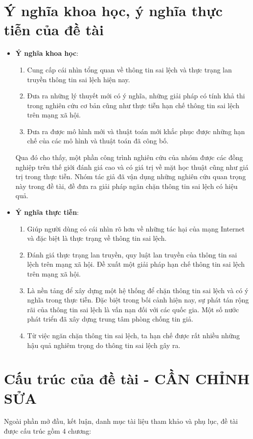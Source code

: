 \tocless\section {Ý nghĩa khoa học, ý nghĩa thực tiễn của đề tài}
\begin {itemize}
	\item {\bfseries Ý nghĩa khoa học}: 
		\begin {enumerate} [+]
			\item Cung cấp cái nhìn tổng quan về thông tin sai lệch và thực trạng lan truyền thông tin sai lệch hiện nay.
			\item Đưa ra những lý thuyết mới có ý nghĩa, những giải pháp có tính khả thi trong nghiên cứu cơ bản cũng như thực tiễn hạn chế thông tin sai lệch trên mạng xã hội.
			\item Đưa ra được mô hình mới và thuật toán mới khắc phục được những hạn chế của các mô hình và thuật toán đã công bố.
		\end {enumerate}
		Qua đó cho thấy, một phần công trình nghiên cứu của nhóm được các đồng nghiệp trên thế giới đánh giá cao và có giá trị về mặt học thuật cũng như giá trị trong thực tiễn. Nhóm tác giả đã vận dụng những nghiên cứu quan trọng này trong đề tài, đề đưa ra giải pháp ngăn chặn thông tin sai lệch có hiệu quả.
	\item {\bfseries Ý nghĩa thực tiễn}:
		\begin {enumerate} [+]
			\item Giúp người dùng có cái nhìn rõ hơn về những tác hại của mạng Internet và đặc biệt là thực trạng về thông tin sai lệch.
			\item Đánh giá thực trạng lan truyền, quy luật lan truyền của thông tin sai lệch trên mạng xã hội. Đề xuất một giải pháp hạn chế thông tin sai lệch trên mạng xã hội.
			\item Là nền tảng để xây dựng một hệ thống để chặn thông tin sai lệch và có ý nghĩa trong thực tiễn. Đặc biệt trong bối cảnh hiện nay, sự phát tán rộng rãi của thông tin sai lệch là vấn nạn đối với các quốc gia. Một số nước phát triển đã xây dựng trung tâm phòng chống tin giả.
			\item Từ việc ngăn chặn thông tin sai lệch, ta hạn chế được rất nhiều những hậu quả nghiêm trọng do thông tin sai lệch gây ra.
		\end {enumerate}
\end {itemize}

\tocless\section {Cấu trúc của đề tài - CẦN CHỈNH SỬA}
Ngoài phần mở đầu, kết luận, danh mục tài liệu tham khảo và phụ lục, đề tài được cấu trúc gồm 4 chương:

